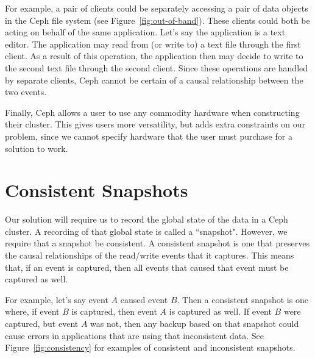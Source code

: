 For example, a pair of clients could be separately accessing a pair of data 
objects in the Ceph file system (see Figure~\ref{fig:out-of-band}). These clients could both be acting on behalf 
of the same application. Let's say the application is a text editor. The 
application may read from (or write to) a text file through the first client. 
As a result of this operation, the application then may decide to write to the 
second text file through the second client. Since these operations are handled 
by separate clients, Ceph cannot be certain of a causal relationship between 
the two events. 

Finally, Ceph allows a user to use any commodity hardware when constructing 
their cluster. This gives users more versatility, but adds extra constraints 
on our problem, since we cannot specify hardware that the user must purchase 
for a solution to work.

\section{Consistent Snapshots}

Our solution will require us to record the global state of the data in a Ceph 
cluster. A recording of that global state is called a ``snapshot". However, we 
require that a snapshot be consistent. A consistent snapshot is one that 
preserves the causal relationships of the read/write events that it captures.
This means that, if an event is captured, then all events that caused that 
event must be captured as well. 

For example, let's say event $A$ caused event $B$. Then a consistent snapshot 
is one where, if event $B$ is captured, then event $A$ is captured as well. If
event $B$ were captured, but event $A$ was not, then any backup based on that
snapshot could cause errors in applications that are using that inconsistent
data. See Figure~\ref{fig:consistency} for examples of consistent and 
inconsistent snapshots.

